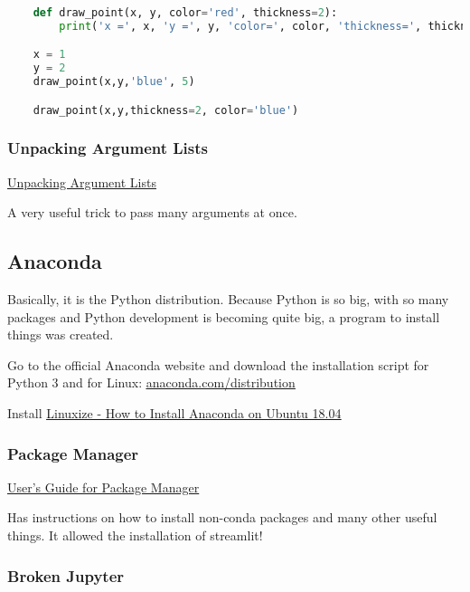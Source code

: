 \begin{lstlisting}[language=python]
    
    def draw_point(x, y, color='red', thickness=2): 
        print('x =', x, 'y =', y, 'color=', color, 'thickness=', thickness)

    x = 1
    y = 2
    draw_point(x,y,'blue', 5)

    draw_point(x,y,thickness=2, color='blue')

\end{lstlisting}



\subsubsection{Unpacking Argument Lists}

\href{https://docs.python.org/3.7/tutorial/controlflow.html#unpacking-argument-lists}{\ul{Unpacking Argument Lists}}

A very useful trick to pass many arguments at once.




\subsection{Anaconda}
Basically, it is the Python distribution. Because Python is so big, with so many packages and Python development is becoming quite big, a program to install things was created.

Go to the official Anaconda website and download the installation script for Python 3 and for Linux: \href{https://www.anaconda.com/distribution/}{\ul{anaconda.com/distribution}}


Install \href{https://linuxize.com/post/how-to-install-anaconda-on-ubuntu-18-04/}{\ul{Linuxize - How to Install Anaconda on Ubuntu 18.04}}

\subsubsection{Package Manager}
\href{https://docs.conda.io/projects/conda/en/latest/user-guide/tasks/manage-pkgs.html}{\ul{User's Guide for Package Manager}}

Has instructions on how to install non-conda packages and many other useful things. It allowed the installation of streamlit!

\subsubsection{Broken Jupyter}

